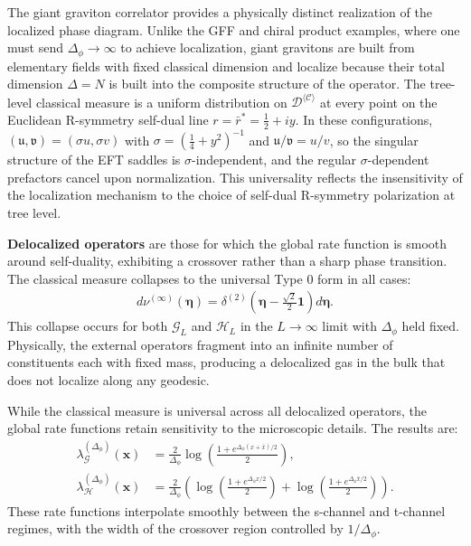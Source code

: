 \documentclass[a4paper,11pt]{article}
\theoremstyle{plain}
\theoremstyle{definition}
\theoremstyle{remark}
\newcommand{\bs}[1]{\boldsymbol{#1}}
\newcommand{\ba}{\begin{equation} \begin{aligned}}
\newcommand{\ea}{\end{aligned} \end{equation}}
\newcommand{\Df}{\Delta_\phi}
\newcommand{\De}{\Delta}
\begin{document}
The giant graviton correlator provides a physically distinct realization of the localized phase diagram. Unlike the GFF and chiral product examples, where one must send $\Df \to \infty$ to achieve localization, giant gravitons are built from elementary fields with fixed classical dimension and localize because their total dimension $\De = N$ is built into the composite structure of the operator. The tree-level classical measure is a uniform distribution on $\mathcal{D}^{\langle \mathcal{C}\rangle}$ at every point on the Euclidean R-symmetry self-dual line $r = \bar{r}^* = \frac{1}{2} + i y$. In these configurations, $(\mathfrak{u},\mathfrak{v}) = (\sigma u ,\sigma v)$ with $\sigma = \left(\frac{1}{4} + y^2\right)^{-1}$ and $\mathfrak{u}/\mathfrak{v} = u/v$, so the singular structure of the EFT saddles is $\sigma$-independent, and the regular $\sigma$-dependent prefactors cancel upon normalization. This universality reflects the insensitivity of the localization mechanism to the choice of self-dual R-symmetry polarization at tree level.

\textbf{Delocalized operators} are those for which the global rate function is smooth around self-duality, exhibiting a crossover rather than a sharp phase transition. The classical measure collapses to the universal Type 0 form in all cases:
\ba
d\nu^{(\infty)}(\bs{\eta}) = \delta^{(2)}\!\left(\bs{\eta} - \frac{\sqrt{2}}{2}\bs{1}\right) d\bs{\eta}.
\ea
This collapse occurs for both $\mathcal{G}_L$ and $\mathcal{H}_L$ in the $L \to \infty$ limit with $\Df$ held fixed. Physically, the external operators fragment into an infinite number of constituents each with fixed mass, producing a delocalized gas in the bulk that does not localize along any geodesic. 

While the classical measure is universal across all delocalized operators, the global rate functions retain sensitivity to the microscopic details. The results are:
\ba
\lambda^{(\Df)}_{\mathcal{G}}(\bs{x}) &= \frac{2}{\Df} \log\left(\frac{1 + e^{\Df(x + \bar{x})/2}}{2}\right), \\
\lambda^{(\Df)}_{\mathcal{H}}(\bs{x}) &= \frac{2}{\Df}\left( \log\left(\frac{1 + e^{\Df x/2}}{2}\right) + \log\left(\frac{1 + e^{\Df \bar{x}/2}}{2}\right)\right).
\ea
These rate functions interpolate smoothly between the s-channel and t-channel regimes, with the width of the crossover region controlled by $1/\Df$.
\end{document}
